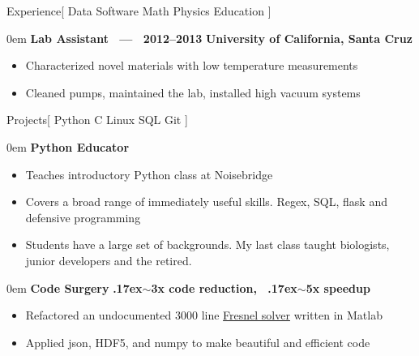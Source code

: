 \documentclass[11pt,a4paper]{article}
\newenvironment{headedsection}[2]{
    \begin{addmargin}[0.5em]{0em}
    {\large\bfseries #1} \hfill {\bfseries #2}%
    \begin{itemize}
        [label={}, topsep=0pt, itemsep=1.5pt, parsep=0pt, leftmargin=1.5em]
}{
    \end{itemize}
    \end{addmargin}
    \medskip
}
\newcommand{\mytilde}{\raise.17ex\hbox{$\scriptstyle\sim$}}
\begin{document}
\begin{mysection}{Experience}[
    Data 
    \textbullet{} Software
    \textbullet{} Math
    \textbullet{} Physics
    \textbullet{} Education
]
    \begin{headedsection}
          {Lab Assistant \ --- \ 2012--2013}
          {University of California, Santa Cruz}

        \item Characterized novel materials with low temperature measurements
        \item Cleaned pumps, maintained the lab, installed high vacuum systems
    \end{headedsection}
\end{mysection}

\begin{mysection}{Projects}[
    Python \textbullet{} C \textbullet{} Linux \textbullet{} SQL \textbullet{} Git
]

    \begin{headedsection}{Python Educator}{}
        \item Teaches introductory Python class at Noisebridge
        \item Covers a broad range of immediately useful skills.  Regex, SQL, flask and defensive programming
        \item Students have a large set of backgrounds.
            My last class taught biologists, junior developers and the retired.
    \end{headedsection}

    \begin{headedsection}{Code Surgery}
          {\mytilde{}3x code reduction, \ \mytilde{}5x speedup}

        \item Refactored an undocumented 3000 line
            \href{https://en.wikipedia.org/wiki/Fresnel_equations}
                {Fresnel solver}
             written in Matlab
        \item Applied json, HDF5, and numpy to make beautiful and efficient 
            code
    \end{headedsection}
\end{mysection}
\end{document}
